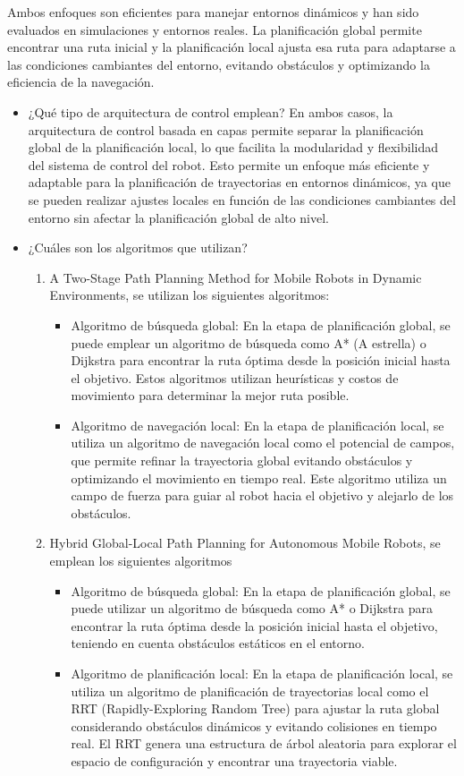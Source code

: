 \documentclass{article}
\begin{document}
Ambos enfoques son eficientes para manejar entornos dinámicos y han sido evaluados en simulaciones y entornos reales. La planificación global permite encontrar una ruta inicial y la planificación local ajusta esa ruta para adaptarse a las condiciones cambiantes del entorno, evitando obstáculos y optimizando la eficiencia de la navegación.

\begin{itemize}
\item ¿Qué tipo de arquitectura de control emplean?
  En ambos casos, la arquitectura de control basada en capas permite separar la planificación global de la planificación local, lo que facilita la modularidad y flexibilidad del sistema de control del robot. Esto permite un enfoque más eficiente y adaptable para la planificación de trayectorias en entornos dinámicos, ya que se pueden realizar ajustes locales en función de las condiciones cambiantes del entorno sin afectar la planificación global de alto nivel.
\item ¿Cuáles son los algoritmos que utilizan?
  \begin{enumerate}
  \item A Two-Stage Path Planning Method for Mobile Robots in Dynamic Environments, se utilizan los siguientes algoritmos:
    \begin{itemize}
    \item Algoritmo de búsqueda global: En la etapa de planificación global, se puede emplear un algoritmo de búsqueda como A* (A estrella) o Dijkstra para encontrar la ruta óptima desde la posición inicial hasta el objetivo. Estos algoritmos utilizan heurísticas y costos de movimiento para determinar la mejor ruta posible.
    \item Algoritmo de navegación local: En la etapa de planificación local, se utiliza un algoritmo de navegación local como el potencial de campos, que permite refinar la trayectoria global evitando obstáculos y optimizando el movimiento en tiempo real. Este algoritmo utiliza un campo de fuerza para guiar al robot hacia el objetivo y alejarlo de los obstáculos.
    \end{itemize}
  \item Hybrid Global-Local Path Planning for Autonomous Mobile Robots, se emplean los siguientes algoritmos
    \begin{itemize}
    \item Algoritmo de búsqueda global: En la etapa de planificación global, se puede utilizar un algoritmo de búsqueda como A* o Dijkstra para encontrar la ruta óptima desde la posición inicial hasta el objetivo, teniendo en cuenta obstáculos estáticos en el entorno.
    \item Algoritmo de planificación local: En la etapa de planificación local, se utiliza un algoritmo de planificación de trayectorias local como el RRT (Rapidly-Exploring Random Tree) para ajustar la ruta global considerando obstáculos dinámicos y evitando colisiones en tiempo real. El RRT genera una estructura de árbol aleatoria para explorar el espacio de configuración y encontrar una trayectoria viable.
    \end{itemize}
    

\end{enumerate}
\end{itemize}
\end{document}
